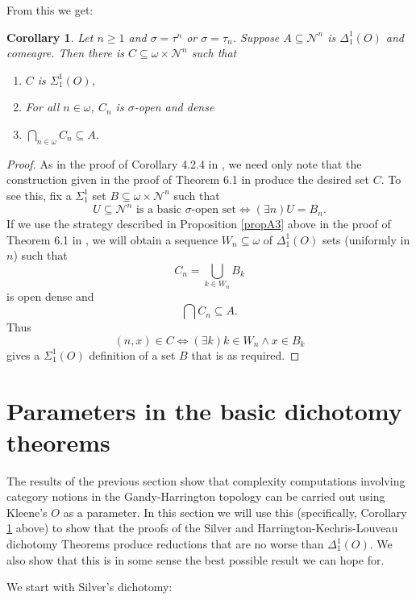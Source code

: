 \documentclass[11pt, english]{article}
\newtheorem{cor}{Corollary}
\newcommand{\baire}{\mathscr N}
\begin{document}
From this we get:

\begin{cor}
Let $n\geq 1$ and $\sigma=\tau^n$ or $\sigma=\tau_n$. Suppose
$A\subseteq\baire^n$ is $\Delta^1_1(O)$ and comeagre. Then there
is $C\subseteq\omega\times\baire^n$ such that
\begin{enumerate}[$(1)$]
\item $C$ is $\Sigma^1_1(O)$, \item For all $n\in\omega$, $C_n$ is
$\sigma$-open and dense \item $\bigcap_{n\in\omega} C_n\subseteq
A$.
\end{enumerate}
\label{effcomeagre}
\end{cor}

\begin{proof}
As in the proof of Corollary 4.2.4 in \cite{kechris73}, we need
only note that the construction given in the proof of Theorem 6.1
in \cite{oxtoby96} produce the desired set $C$. To see this, fix a
$\Sigma^1_1$ set $B\subseteq\omega\times\baire^n$ such that
$$
U\subseteq\baire^n \text{ is a basic $\sigma$-open set}\iff
(\exists n) U=B_n.
$$
If we use the strategy described in Proposition \ref{propA3} above in the
proof of Theorem 6.1 in \cite{oxtoby96}, we will obtain a sequence
$W_n\subseteq\omega$ of $\Delta^1_1(O)$ sets (uniformly in $n$)
such that
$$
C_n=\bigcup_{k\in W_n} B_k
$$
is open dense and
$$
\bigcap C_n\subseteq A.
$$
Thus
$$
(n,x)\in C\iff (\exists k) k\in W_n\wedge x\in B_k
$$
gives a $\Sigma^1_1(O)$ definition of a set $B$ that is as
required.
\end{proof}

\section{Parameters in the basic dichotomy theorems}\label{optsec}

The results of the previous section show that complexity
computations involving category notions in the Gandy-Harrington
topology can be carried out using Kleene's $O$ as a parameter. In
this section we will use this (specifically, Corollary \ref{effcomeagre} above) to
show that the proofs of the Silver and Harrington-Kechris-Louveau
dichotomy Theorems produce reductions that are no worse than
$\Delta^1_1(O)$. We also show that this is in some sense the best
possible result we can hope for.

We start with Silver's dichotomy:
\end{document}
